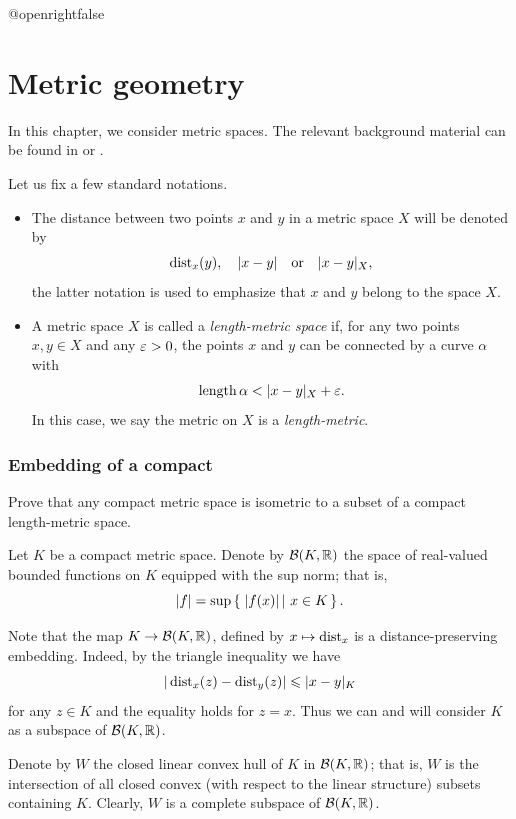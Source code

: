 \csname @openrightfalse\endcsname
\chapter{Metric geometry}

In this chapter, we consider metric spaces.
The relevant background material can be found in \cite{bbi} or \cite{petrunin2021pure}.

Let us fix a few standard notations.
\begin{itemize}
\item The distance between two points $x$ and $y$ in a metric space $X$
will be denoted by 
\[\operatorname{\rm dist}\nolimits_x(y),
\quad
|x-y|
\quad\text{or}\quad
|x-y|_X,
\]
the latter notation is used to emphasize that $x$ and $y$ belong to the space $X$.
\item A metric space $X$ is called a {}\emph{length-metric space} if, for any two points $x,y\in X$ and any $\varepsilon>0$, the points $x$ and $y$ can be connected by a curve $\alpha$ with
\[\length\alpha<|x-y|_X+\eps.\]
In this case, we say the metric on $X$ is a \emph{length-metric}.
\end{itemize}

\subsection*{Embedding of a compact}
\label{compact} 

\begin{pr}
Prove that any compact metric space is isometric to a subset of a compact length-metric space.
\end{pr}

Let $K$ be a compact metric space.
Denote by $\mathcal{B}(K,\mathbb{R})$ the space of real-valued bounded functions on $K$ equipped with the sup norm;
that is,
\[|f|=\sup\set{|f(x)|}{x\in K}.\]

Note that the map $K\to \mathcal{B}(K,\mathbb{R})$, defined by $x\mapsto \operatorname{\rm dist}\nolimits_x$ is a distance-preserving embedding.
Indeed, by the triangle inequality we have
\[|\operatorname{\rm dist}\nolimits_x(z)-\operatorname{\rm dist}\nolimits_y(z)|\leqslant |x-y|_K\]
for any $z\in K$ and the equality holds for $z=x$.
Thus we can and will consider $K$ as a subspace of $\mathcal{B}(K,\mathbb{R})$.

Denote by $W$ the closed linear convex hull of $K$ in $\mathcal{B}(K,\mathbb{R})$;
that is, $W$ is the intersection of all closed convex (with respect to the linear structure) subsets containing $K$.
Clearly, $W$ is a complete subspace of $\mathcal{B}(K,\mathbb{R})$.

